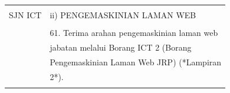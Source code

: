 \documentclass[
]{article}
\begin{document}
\begin{longtable}[]{@{}ll@{}}
\begin{minipage}[t]{0.23\columnwidth}
\strut
\end{minipage} & \begin{minipage}[t]{0.71\columnwidth}\raggedright
\strut
\end{minipage}\tabularnewline
\begin{minipage}[t]{0.23\columnwidth}\raggedright
SJN ICT\strut
\end{minipage} & \begin{minipage}[t]{0.71\columnwidth}\raggedright
ii) PENGEMASKINIAN LAMAN WEB\strut
\end{minipage}\tabularnewline
\begin{minipage}[t]{0.23\columnwidth}\raggedright
\strut
\end{minipage} & \begin{minipage}[t]{0.71\columnwidth}\raggedright
\strut
\end{minipage}\tabularnewline
\begin{minipage}[t]{0.23\columnwidth}\raggedright
\strut
\end{minipage} & \begin{minipage}[t]{0.71\columnwidth}\raggedright
61. Terima arahan pengemaskinian laman web\strut
\end{minipage}\tabularnewline
\begin{minipage}[t]{0.23\columnwidth}\raggedright
\strut
\end{minipage} & \begin{minipage}[t]{0.71\columnwidth}\raggedright
jabatan melalui Borang ICT 2 (Borang\strut
\end{minipage}\tabularnewline
\begin{minipage}[t]{0.23\columnwidth}\raggedright
\strut
\end{minipage} & \begin{minipage}[t]{0.71\columnwidth}\raggedright
Pengemaskinian Laman Web JRP) (*Lampiran\strut
\end{minipage}\tabularnewline
\begin{minipage}[t]{0.23\columnwidth}\raggedright
\strut
\end{minipage} & \begin{minipage}[t]{0.71\columnwidth}\raggedright
2*).\strut
\end{minipage}\tabularnewline
\begin{minipage}[t]{0.23\columnwidth}\raggedright
\strut
\end{minipage} & \begin{minipage}[t]{0.71\columnwidth}\raggedright
\strut
\end{minipage}\tabularnewline

\end{longtable}
\end{document}
